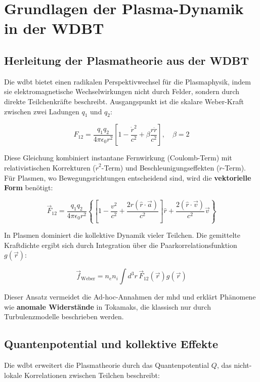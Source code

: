 \chapter{Grundlagen der Plasma-Dynamik in der WDBT}
\label{ch:grundlagen}
\section{Herleitung der Plasmatheorie aus der WDBT}
Die \gls{wdbt} bietet einen radikalen Perspektivwechsel für die Plasmaphysik, indem sie elektromagnetische Wechselwirkungen nicht durch Felder, sondern durch direkte
Teilchenkräfte beschreibt. Ausgangspunkt ist die skalare Weber-Kraft zwischen zwei Ladungen $q_1$ und $q_2$:

\begin{equation}
    \label{eq:weber_em_skalar}
    F_{12} = \frac{q_1 q_2}{4\pi \epsilon_0 r^2} \left[ 1 - \frac{\dot{r}^2}{c^2} + \beta \frac{r \ddot{r}}{c^2} \right],\quad \beta = 2
\end{equation}

Diese Gleichung kombiniert instantane Fernwirkung (Coulomb-Term) mit relativistischen Korrekturen ($\dot{r}^2$-Term) und Beschleunigungseffekten ($\ddot{r}$-Term). Für Plasmen,
wo Bewegungsrichtungen entscheidend sind, wird die \textbf{vektorielle Form} benötigt:

\begin{equation}
    \label{eq:weber_em_vektor}
    \vec{F}_{12} = \frac{q_1 q_2}{4\pi \epsilon_0 r^2} \left\{ \left[ 1 - \frac{v^2}{c^2} + \frac{2 r (\hat{r} \cdot \vec{a})}{c^2} \right] \hat{r} + \frac{2 (\hat{r} \cdot \vec{v})}{c^2} \vec{v} \right\}
\end{equation}

In Plasmen dominiert die kollektive Dynamik vieler Teilchen. Die gemittelte Kraftdichte ergibt sich durch Integration über die Paarkorrelationsfunktion $g(\vec{r})$:

\begin{equation}
    \label{eq:weber_kraftdichte}
    \vec{f}_{\text{Weber}} = n_e n_i \int d^3r \, \vec{F}_{12}(\vec{r}) g(\vec{r})
\end{equation}

Dieser Ansatz vermeidet die Ad-hoc-Annahmen der \gls{mhd} und erklärt Phänomene wie \textbf{anomale Widerstände} in Tokamaks, die klassisch nur durch Turbulenzmodelle beschrieben
werden.

\section{Quantenpotential und kollektive Effekte}
Die \gls{wdbt} erweitert die Plasmatheorie durch das Quantenpotential $Q$, das nicht-lokale Korrelationen zwischen Teilchen beschreibt:

